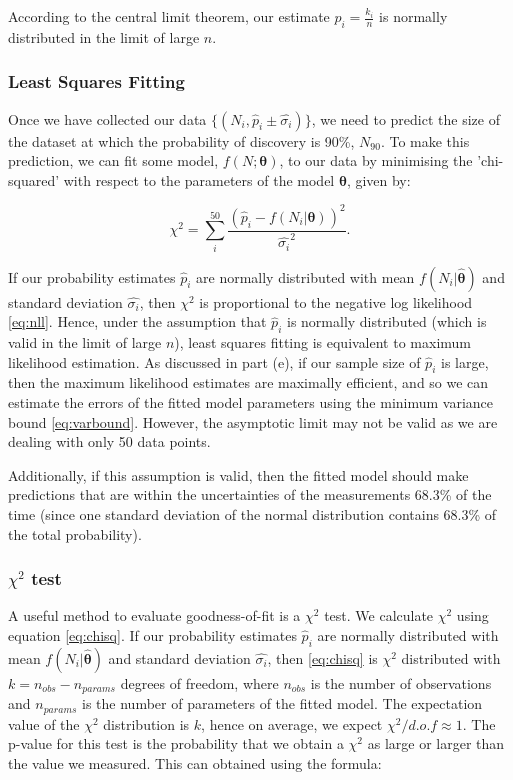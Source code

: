\documentclass{article}
\begin{document}
According to the central limit theorem, our estimate $\hat{p}_i = \frac{k_i}{n}$ is normally distributed in the limit of large $n$.

\subsubsection*{Least Squares Fitting}

Once we have collected our data $\{(N_i, \hat{p}_i \pm \hat{\sigma_i})\}$, we need to predict the size of the dataset at which the probability of discovery is 90\%, $N_{90}$. To make this prediction, we can fit some model, $f(N; \boldsymbol{\theta})$, to our data by minimising the 'chi-squared' with respect to the parameters of the model $\boldsymbol{\theta}$, given by:

\begin{equation}
\chi^2 = \sum_i^{50} \frac{(\hat{p}_i - f(N_i| \boldsymbol{\theta}))^2}{\hat{\sigma_i}^2}.
\label{eq:chisq}
\end{equation}

If our probability estimates $\hat{p}_i$ are normally distributed with mean $f(N_i| \hat{\boldsymbol{\theta}})$ and standard deviation $\hat{\sigma_i}$, then $\chi^2$ is proportional to the negative log likelihood \ref{eq:nll}. Hence, under the assumption that $\hat{p}_i$ is normally distributed (which is valid in the limit of large $n$), least squares fitting is equivalent to maximum likelihood estimation. As discussed in part (e), if our sample size of $\hat{p}_i$ is large, then the maximum likelihood estimates are maximally efficient, and so we can estimate the errors of the fitted model parameters using the minimum variance bound \ref{eq:varbound}. However, the asymptotic limit may not be valid as we are dealing with only 50 data points. 

Additionally, if this assumption is valid, then the fitted model should make predictions that are within the uncertainties of the measurements 68.3\% of the time (since one standard deviation of the normal distribution contains 68.3\% of the total probability). 

\subsubsection*{$\chi^2$ test}

A useful method to evaluate goodness-of-fit is a $\chi^2$ test. We calculate $\chi^2$ using equation \ref{eq:chisq}. If our probability estimates $\hat{p}_i$ are normally distributed with mean $f(N_i| \hat{\boldsymbol{\theta}})$ and standard deviation $\hat{\sigma_i}$, then \ref{eq:chisq} is $\chi^2$ distributed with $k = n_{obs} - n_{params}$ degrees of freedom, where $n_{obs}$ is the number of observations and $n_{params}$ is the number of parameters of the fitted model. The expectation value of the $\chi^2$ distribution is $k$, hence on average, we expect $\chi^2/d.o.f \approx 1$. The p-value for this test is the probability that we obtain a $\chi^2$ as large or larger than the value we measured. This can obtained using the formula:
\end{document}
